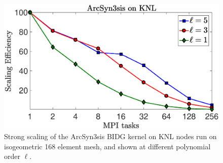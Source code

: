 \begin{figure}
\begin{center}
\includegraphics[width=0.99\linewidth]{./bidg_data/2nd_try/scaling}
\end{center}
\vspace*{-.5cm}
\caption{Strong scaling of the ArcSyn3sis BIDG kernel on KNL nodes run on
isogeometric 168 element mesh, and shown at different polynomial order $\ell$.}
\label{fig:bidg_scaling}
\end{figure}



